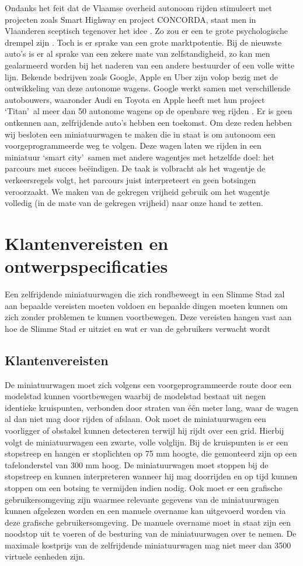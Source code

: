 \documentclass[a4paper,kulak]{kulakarticle}
\begin{document}
Ondanks het feit dat de Vlaamse overheid autonoom rijden stimuleert met projecten zoals Smart Highway en project CONCORDA, staat men in Vlaanderen sceptisch tegenover het idee \cite{vbn}. Zo zou er een te grote psychologische drempel zijn \cite{scept}. Toch is er sprake van een grote marktpotentie. Bij de nieuwste auto's is er al sprake van een zekere mate van zelfstandigheid, zo kan men gealarmeerd worden bij het naderen van een andere bestuurder of een volle witte lijn. Bekende bedrijven zoals Google, Apple en Uber zijn volop bezig met de ontwikkeling van deze autonome wagens. Google werkt samen met verschillende autobouwers, waaronder Audi en Toyota en Apple heeft met hun project \lq Titan\rq\ al meer dan 50 autonome wagens op de openbare weg rijden \cite{bedrijven}. Er is geen ontkennen aan, zelfrijdende auto's hebben een toekomst. Om deze reden hebben wij besloten een miniatuurwagen te maken die in staat is om autonoom een voorgeprogrammeerde weg te volgen. Deze wagen laten we rijden in een miniatuur \lq smart city\rq\ samen met andere wagentjes met hetzelfde doel: het parcours met succes beëindigen. De taak is volbracht als het wagentje de verkeersregels volgt, het parcours juist interpreteert en geen botsingen veroorzaakt. We maken van de gekregen vrijheid gebruik om het wagentje volledig (in de mate van de gekregen vrijheid) naar onze hand te zetten.

\section{Klantenvereisten en ontwerpspecificaties}
Een zelfrijdende miniatuurwagen die zich rondbeweegt in een Slimme Stad zal aan bepaalde vereisten moeten voldoen en bepaalde dingen moeten kunnen om zich zonder problemen te kunnen voortbewegen. Deze vereisten hangen vast aan hoe de Slimme Stad er uitziet en wat er van de gebruikers verwacht wordt


\subsection{Klantenvereisten}
De miniatuurwagen moet zich volgens een voorgeprogrammeerde route door een modelstad kunnen voortbewegen waarbij de modelstad bestaat uit negen identieke kruispunten, verbonden door straten van één meter lang, waar de wagen al dan niet mag door rijden of afslaan. Ook moet de miniatuurwagen een voorligger of obstakel kunnen detecteren terwijl hij rijdt over een grid. Hierbij volgt de miniatuurwagen een zwarte, volle volglijn. Bij de kruispunten is er een stopstreep en hangen er stoplichten op 75 mm hoogte, die gemonteerd zijn op een tafelonderstel van 300 mm hoog. De miniatuurwagen moet stoppen bij de stopstreep en kunnen interpreteren wanneer hij mag doorrijden en op tijd kunnen stoppen om een botsing te vermijden indien nodig. Ook moet er een grafische gebruikersomgeving zijn waarmee relevante gegevens van de miniatuurwagen kunnen afgelezen worden en een manuele overname kan uitgevoerd worden via deze grafische gebruikersomgeving. De manuele overname moet in staat zijn een noodstop uit te voeren of de besturing van de miniatuurwagen over te nemen. De maximale kostprijs van de zelfrijdende miniatuurwagen mag niet meer dan 3500 virtuele eenheden zijn.
\end{document}
